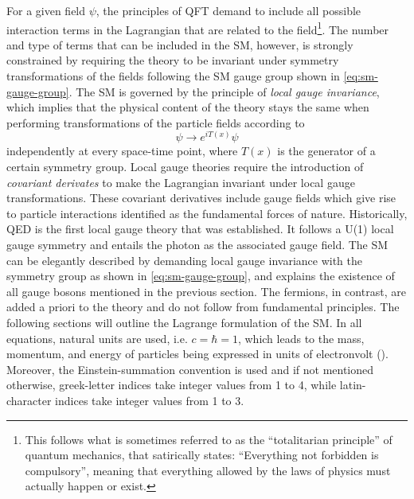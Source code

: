 For a given field $\psi$, the principles of QFT demand to include all possible interaction terms in the Lagrangian that are related to the field\footnote{This follows what is sometimes referred to as the ``totalitarian principle'' of quantum mechanics, that satirically states: ``Everything not forbidden is compulsory'', meaning that everything allowed by the laws of physics must actually happen or exist.}.
The number and type of terms that can be included in the SM, however, is strongly constrained by requiring the theory to be invariant under symmetry transformations of the fields following the SM gauge group shown in \cref{eq:sm-gauge-group}.
The SM is governed by the principle of \emph{local gauge invariance}, which implies that the physical content of the theory stays the same when performing transformations of the particle fields according to
\begin{equation}
  \psi \rightarrow e^{iT(x)} \psi
\end{equation}
independently at every space-time point, where $T(x)$ is the generator of a certain symmetry group.
Local gauge theories require the introduction of \emph{covariant derivates} to make the Lagrangian invariant under local gauge transformations. These covariant derivatives include gauge fields which give rise to particle interactions identified as the fundamental forces of nature.
Historically, QED is the first local gauge theory that was established. It follows a U(1) local gauge symmetry and entails the photon as the associated gauge field.
The SM can be elegantly described by demanding local gauge invariance with the symmetry group as shown in \cref{eq:sm-gauge-group}, and explains the existence of all gauge bosons mentioned in the previous section.
The fermions, in contrast, are added a priori to the theory and do not follow from fundamental principles.
The following sections will outline the Lagrange formulation of the SM.
In all equations, natural units are used, i.e. $c = \hbar = 1$, which leads to the mass, momentum, and energy of particles being expressed in units of electronvolt (\eV).
Moreover, the Einstein-summation convention is used and if not mentioned otherwise, greek-letter indices take integer values from 1 to 4, while latin-character indices take integer values from 1 to 3.

